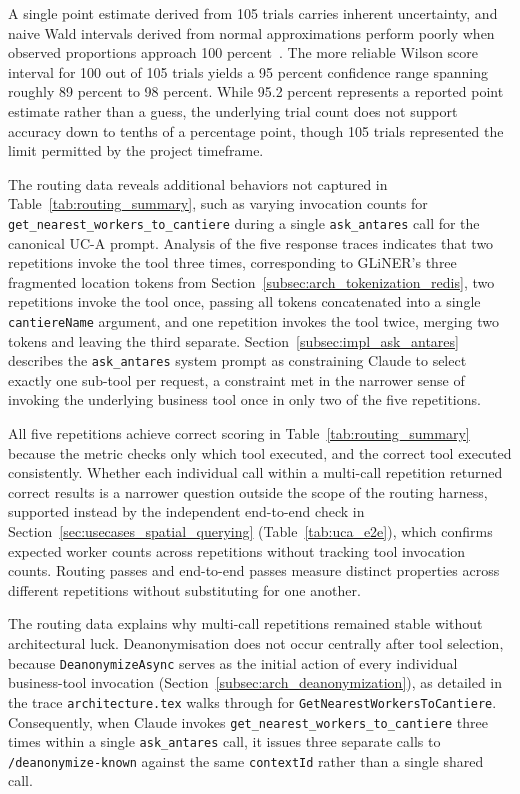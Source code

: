 A single point estimate derived from 105 trials carries inherent uncertainty, and naive Wald intervals derived from normal approximations perform poorly when observed proportions approach 100 percent~\cite{brown2001interval}. The more reliable Wilson score interval for 100 out of 105 trials yields a 95 percent confidence range spanning roughly 89 percent to 98 percent. While 95.2 percent represents a reported point estimate rather than a guess, the underlying trial count does not support accuracy down to tenths of a percentage point, though 105 trials represented the limit permitted by the project timeframe.

The routing data reveals additional behaviors not captured in Table~\ref{tab:routing_summary}, such as varying invocation counts for \texttt{get\_nearest\_workers\_to\_cantiere} during a single \texttt{ask\_antares} call for the canonical UC-A prompt. Analysis of the five response traces indicates that two repetitions invoke the tool three times, corresponding to GLiNER's three fragmented location tokens from Section~\ref{subsec:arch_tokenization_redis}, two repetitions invoke the tool once, passing all tokens concatenated into a single \texttt{cantiereName} argument, and one repetition invokes the tool twice, merging two tokens and leaving the third separate. Section~\ref{subsec:impl_ask_antares} describes the \texttt{ask\_antares} system prompt as constraining Claude to select exactly one sub-tool per request, a constraint met in the narrower sense of invoking the underlying business tool once in only two of the five repetitions.

All five repetitions achieve correct scoring in Table~\ref{tab:routing_summary} because the metric checks only which tool executed, and the correct tool executed consistently. Whether each individual call within a multi-call repetition returned correct results is a narrower question outside the scope of the routing harness, supported instead by the independent end-to-end check in Section~\ref{sec:usecases_spatial_querying} (Table~\ref{tab:uca_e2e}), which confirms expected worker counts across repetitions without tracking tool invocation counts. Routing passes and end-to-end passes measure distinct properties across different repetitions without substituting for one another.

The routing data explains why multi-call repetitions remained stable without architectural luck. Deanonymisation does not occur centrally after tool selection, because \texttt{DeanonymizeAsync} serves as the initial action of every individual business-tool invocation (Section~\ref{subsec:arch_deanonymization}), as detailed in the trace \texttt{architecture.tex} walks through for \texttt{GetNearestWorkersToCantiere}. Consequently, when Claude invokes \texttt{get\_nearest\_workers\_to\_cantiere} three times within a single \texttt{ask\_antares} call, it issues three separate calls to \texttt{/deanonymize-known} against the same \texttt{contextId} rather than a single shared call.

